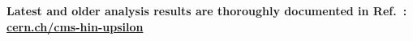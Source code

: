 %
%
%
%
%

\vskip 1cm 

{\bf{
Latest and older analysis results are thoroughly documented in Ref.~\cite{site-fit}: \\

\hspace{3cm} \href{http://cern.ch/cms-hin-upsilon/fitting}{\sc\large cern.ch/cms-hin-upsilon}
}}